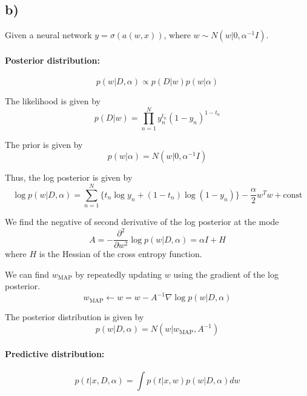 \documentclass[a4paper,12pt]{article}
\begin{document}
\subsection*{b)}

Given a neural network $y = \sigma(a(w, x))$, where $w \sim N(w|0, \alpha^{-1} I)$.

\paragraph{Posterior distribution:}
\begin{equation*}
	p(w|D, \alpha) \propto p(D|w) p(w|\alpha)
\end{equation*}

The likelihood is given by
\begin{equation*}
	p(D|w) = \prod_{n=1}^{N} y_n^{t_n} (1 - y_n)^{1 - t_n}
\end{equation*}

The prior is given by
\begin{equation*}
	p(w|\alpha) = N(w|0, \alpha^{-1} I)
\end{equation*}

Thus, the log posterior is given by
\begin{equation*}
	\log p(w|D, \alpha) = \sum_{n=1}^{N} \{t_n \log y_n + (1 - t_n) \log (1 - y_n)\} - \frac{\alpha}{2} w^T w + \text{const}
\end{equation*}

We find the negative of second derivative of the log posterior at the mode
\begin{equation*}
	A = - \frac{\partial^2}{\partial w^2} \log p(w|D, \alpha) = \alpha I + H
\end{equation*}
where $H$ is the Hessian of the cross entropy function.

We can find $w_\text{MAP}$ by repeatedly updating $w$ using the gradient of the log posterior.
\begin{equation*}
	w_\text{MAP} \leftarrow w = w - A^{-1} \nabla \log p(w|D, \alpha)
\end{equation*}

The posterior distribution is given by
\begin{equation*}
	p(w|D, \alpha) = N(w|w_\text{MAP}, A^{-1})
\end{equation*}

\paragraph{Predictive distribution:}
\begin{equation*}
	p(t|x, D, \alpha) = \int p(t|x, w) p(w|D, \alpha) dw
\end{equation*}
\end{document}
